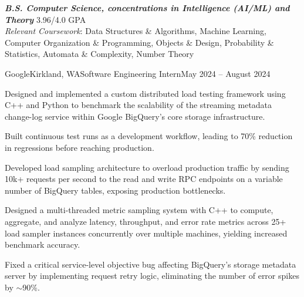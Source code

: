 \documentclass{article}
\begin{document}
\thispagestyle{empty}


\begin{flushleft}


{\textbf{\textit{B.S. Computer Science, concentrations in Intelligence (AI/ML) and Theory}} \hfill 3.96/4.0 GPA \\ \textit{Relevant Coursework}:
    Data Structures \& Algorithms,
    Machine Learning,
    Computer Organization \& Programming,
    Objects \& Design,
    Probability \& Statistics,
    Automata \& Complexity,
    Number Theory%
}



    \begin{experience}{Google}{Kirkland, WA}{Software Engineering Intern}{May 2024 -- August 2024}
        \item Designed and implemented a custom distributed load testing framework using C++ and Python to benchmark the scalability of the streaming metadata change-log service within Google BigQuery's core storage infrastructure.
        \item Built continuous test runs as a development workflow, leading to 70\% reduction in regressions before reaching production.
        \item Developed load sampling architecture to overload production traffic by sending 10k+ requests per second to the read and write RPC endpoints on a variable number of BigQuery tables, exposing production bottlenecks.
        \item Designed a multi-threaded metric sampling system with C++ to compute, aggregate, and analyze latency, throughput, and error rate metrics across 25+ load sampler instances concurrently over multiple machines, yielding increased benchmark accuracy.
        \item Fixed a critical service-level objective bug affecting BigQuery's storage metadata server by implementing request retry logic, eliminating the number of error spikes by $\sim$90\%.
    \end{experience}


\end{flushleft}
\end{document}
